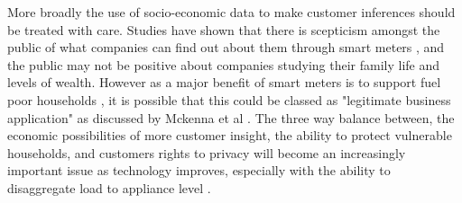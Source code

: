 More broadly the use of socio-economic data to make customer inferences should be treated with care. Studies have shown that there is scepticism amongst the public of what companies can find out about them through smart meters \cite{buchanan2016}, and the public may not be positive about companies studying their family life and levels of wealth. However as a major benefit of smart meters is to support fuel poor households \cite{clastres2016}, it is possible that this could be classed as "legitimate business application" as discussed by Mckenna et al \cite{mckenna2012}. The three way balance between, the economic possibilities of more customer insight, the ability to protect vulnerable households, and customers rights to privacy will become an increasingly important issue as technology improves, especially with the ability to disaggregate load to appliance level \cite{kavousian2013} \cite{weiss}.



